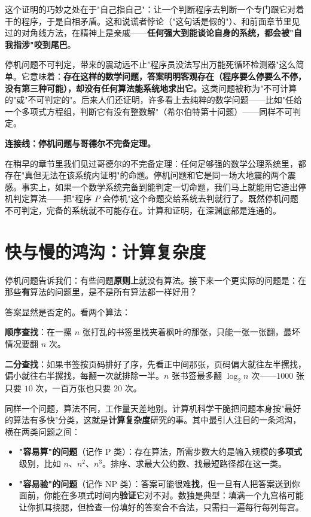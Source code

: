 这个证明的巧妙之处在于"自己指自己"：让一个判断程序去判断一个专门跟它对着干的程序，于是自相矛盾。这和说谎者悖论（"这句话是假的"）、和前面章节里见过的对角线方法，在精神上是亲戚——\textbf{任何强大到能谈论自身的系统，都会被"自我指涉"咬到尾巴}。

停机问题不可判定，带来的震动远不止"程序员没法写出万能死循环检测器"这么简单。它意味着：\textbf{存在这样的数学问题，答案明明客观存在（程序要么停要么不停，没有第三种可能），却没有任何算法能系统地求出它。}这类问题被称为"不可计算的"或"不可判定的"。后来人们还证明，许多看上去纯粹的数学问题——比如"任给一个多项式方程组，判断它有没有整数解"（希尔伯特第十问题）——同样不可判定。

\begin{lianjie}
\textbf{连接线：停机问题与哥德尔不完备定理。}

在稍早的章节里我们见过哥德尔的不完备定理：任何足够强的数学公理系统里，都存在"真但无法在该系统内证明"的命题。停机问题和它是同一场大地震的两个震感。事实上，如果一个数学系统完备到能判定一切命题，我们马上就能用它造出停机判定算法——把"程序 $P$ 会停机"这个命题交给系统去判就行了。既然停机问题不可判定，完备的系统就不可能存在。计算和证明，在深渊底部是连通的。
\end{lianjie}

\section{快与慢的鸿沟：计算复杂度}

停机问题告诉我们：有些问题\textbf{原则上}就没有算法。接下来一个更实际的问题是：在那些\textbf{有}算法的问题里，是不是所有算法都一样好用？

答案显然是否定的。看两个算法：

\textbf{顺序查找}：在一摞 $n$ 张打乱的书签里找夹着枫叶的那张，只能一张一张翻，最坏情况要翻 $n$ 次。

\textbf{二分查找}：如果书签按页码排好了序，先看正中间那张，页码偏大就往左半摞找，偏小就往右半摞找，每翻一次就排除一半。$n$ 张书签最多翻 $\log_2 n$ 次——$1000$ 张只要 $10$ 次，一百万张也只要 $20$ 次。

同样一个问题，算法不同，工作量天差地别。计算机科学干脆把问题本身按"最好的算法有多快"分类，这就是\textbf{计算复杂度}研究的事。其中最引人注目的一条鸿沟，横在两类问题之间：

\begin{itemize}
\item \textbf{"容易算"的问题}（记作 P 类）：存在算法，所需步数大约是输入规模的\textbf{多项式}级别，比如 $n$、$n^2$、$n^3$。排序、求最大公约数、找最短路径都在这一类。
\item \textbf{"容易验"的问题}（记作 NP 类）：答案可能很难\textbf{找}，但一旦有人把答案送到你面前，你能在多项式时间内\textbf{验证}它对不对。数独是典型：填满一个九宫格可能让你抓耳挠腮，但检查一份填好的答案合不合法，只需扫一遍每行每列每宫。
\end{itemize}

